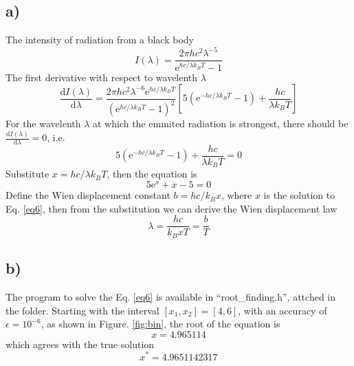 \documentclass[12pt, graphicx]{article}
\begin{document}
\subsection*{a)}
The intensity of radiation from a black body 
\begin{equation}
I(\lambda)=\frac{2\pi hc^2\lambda^{-5}}{\mathrm{e}^{hc/\lambda k_BT}-1}
\end{equation}
The first derivative with respect to wavelenth $\lambda$
\begin{equation}
\frac{\mathrm{d}I(\lambda)}{\mathrm{d}\lambda}=\frac{2\pi hc^2\lambda^{-6}\mathrm{e}^{hc/\lambda k_BT}}{(\mathrm{e}^{hc/\lambda k_BT}-1)^2}[5(\mathrm{e}^{-hc/\lambda k_BT}-1)+\frac{hc}{\lambda k_BT}]
\end{equation}
For the wavelenth $\lambda$ at which the emmited radiation is strongest, there should be $\frac{\mathrm{d}I(\lambda)}{\mathrm{d}\lambda}=0$, i.e. 
\begin{equation}
5(\mathrm{e}^{-hc/\lambda k_BT}-1)+\frac{hc}{\lambda k_BT}=0
\end{equation}
Substitute $x=hc/\lambda k_BT$, then the equation is 
\begin{equation}
5\mathrm{e}^x+x-5=0
\label{eq6}
\end{equation}
Define the Wien displacement constant $b=hc/k_Bx$, where $x$ is the solution to Eq. \ref{eq6}, then from the substitution we can derive the Wien displacement law 
\begin{equation}
\lambda=\frac{hc}{k_BxT}=\frac{b}{T}
\label{eq7}
\end{equation}

\subsection*{b)}
The program to solve the Eq. \ref{eq6} is available in \textquotedblleft root\_finding.h\textquotedblright, attched in the folder. Starting with the interval $[x_1,x_2]=[4,6]$, with an accuracy of $\epsilon=10^{-6}$, as shown in Figure. \ref{fig:bin}, the root of the equation is 
\begin{equation}
x=4.965114
\end{equation}
which agrees with the true solution 
\begin{equation}
x^*=4.9651142317
\end{equation}
\end{document}
